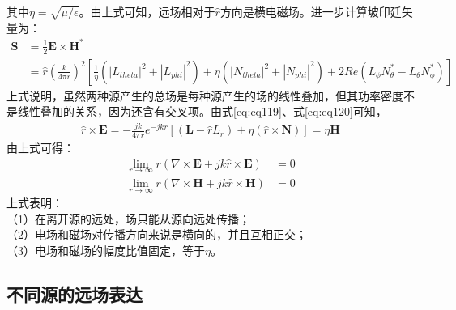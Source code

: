 \documentclass{article}
\numberwithin{equation}{section}
\begin{document}
其中$\eta=\sqrt{\mu/\epsilon}$。由上式可知，远场相对于$\hat{r}$方向是横电磁场。进一步计算坡印廷矢量为：
\begin{align}
    \label{eq:eq122}
    \mathbf{S}&=\frac{1}{2}\mathbf{E}\times\mathbf{H}^* \nonumber \\
              &=\hat{r}\left(\frac{k}{4\pi r}\right)^2\left[\frac{1}{\eta}\left(\left|L_{theta}\right|^2+\left|L_{phi}\right|^2\right)+\eta\left(\left|N_{theta}\right|^2+\left|N_{phi}\right|^2\right)+2Re\left(L_{\phi}N_{\theta}^*-L_{\theta}N_{\phi}^*\right)\right]
\end{align}
上式说明，虽然两种源产生的总场是每种源产生的场的线性叠加，但其功率密度不是线性叠加的关系，因为还含有交叉项。由式\ref{eq:eq119}、式\ref{eq:eq120}可知，
\begin{align}
    \label{eq:eq123}
    \hat{r}\times\mathbf{E}=-\frac{jk}{4\pi r}e^{-jkr}\left[\left(\mathbf{L}-\hat{r}L_r\right)+\eta\left(\hat{r}\times\mathbf{N}\right)\right]=\eta\mathbf{H}
\end{align}
由上式可得\textbf{\color{blue}{索末菲辐射条件}}：
\begin{align}
    \label{eq:eq124}
    \lim_{r\to\infty}r(\nabla\times\mathbf{E}+jk\hat{r}\times\mathbf{E})&=0 \\
    \label{eq:eq125}
    \lim_{r\to\infty}r(\nabla\times\mathbf{H}+jk\hat{r}\times\mathbf{H})&=0
\end{align}
上式表明：\\
（1）在离开源的远处，场只能从源向远处传播；\\
（2）电场和磁场对传播方向来说是横向的，并且互相正交；\\
（3）电场和磁场的幅度比值固定，等于$\eta$。
\subsection{不同源的远场表达}
\end{document}
